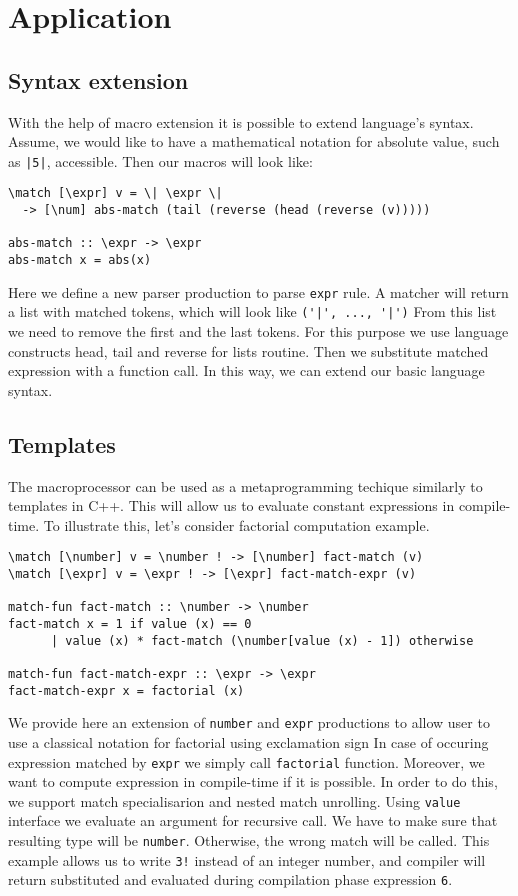\section{Application}
\subsection{Syntax extension}
With the help of macro extension it is possible to extend language's syntax.
Assume, we would like to have a mathematical notation for absolute value, such
as \verb/|5|/, accessible. Then our macros will look like:
\begin{verbatim}
\match [\expr] v = \| \expr \| 
  -> [\num] abs-match (tail (reverse (head (reverse (v)))))

abs-match :: \expr -> \expr
abs-match x = abs(x)
\end{verbatim}
Here we define a new parser production to parse \verb|expr| rule. A matcher
will return a list with matched tokens, which will look like 
\verb/('|', ..., '|')/ From this list we need to remove the first and the last
tokens. For this purpose we use language constructs head, tail and reverse for
lists routine.  Then we substitute matched expression with a function call. In
this way, we can extend our basic language syntax.
\subsection{Templates}
The macroprocessor can be used as a metaprogramming techique similarly to
templates in C++\cite{koskinen}. This will allow us to evaluate
constant expressions in compile-time.  To illustrate this, let's consider
factorial computation example.
\begin{verbatim}
\match [\number] v = \number ! -> [\number] fact-match (v)
\match [\expr] v = \expr ! -> [\expr] fact-match-expr (v)

match-fun fact-match :: \number -> \number
fact-match x = 1 if value (x) == 0
      | value (x) * fact-match (\number[value (x) - 1]) otherwise

match-fun fact-match-expr :: \expr -> \expr
fact-match-expr x = factorial (x)
\end{verbatim}
We provide here an extension of \verb|number| and \verb|expr| productions to
allow user to use a classical notation for factorial using exclamation sign In
case of occuring expression matched by \verb|expr| we simply call
\verb|factorial| function. Moreover, we want to compute expression in
compile-time if it is possible. In order to do this, we support match
specialisarion and nested match unrolling. Using \verb|value| interface we
evaluate an argument for recursive call. We have to make sure that resulting
type will be \verb|number|. Otherwise, the wrong match will be called.  This
example allows us to write \verb|3!| instead of an integer  number, and
compiler will return substituted and evaluated during compilation phase
expression \verb|6|.

